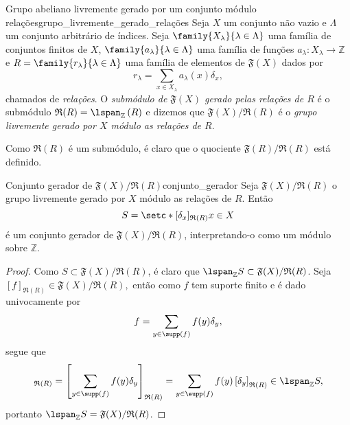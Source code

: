 \begin{definition}{Grupo abeliano livremente gerado por um conjunto módulo relações}{grupo_livremente_gerado_relações}
    Seja \(X\) um conjunto não vazio e \(\Lambda\) um conjunto arbitrário de índices. Seja \(\family{X_{\lambda}}{\lambda \in \Lambda}\) uma família de conjuntos finitos de \(X\), \(\family{a_{\lambda}}{\lambda \in \Lambda}\) uma família de funções \(a_{\lambda} : X_{\lambda} \to \mathbb{Z}\) e \(R = \family{r_{\lambda}}{\lambda \in \Lambda}\) uma família de elementos de \(\mathfrak{F}(X)\) dados por
    \begin{equation*}
        r_{\lambda} = \sum_{x \in X_{\lambda}} a_{\lambda}(x) \delta_{x},
    \end{equation*}
    chamados de \emph{relações}. O \emph{submódulo de \(\mathfrak{F}(X)\) gerado pelas relações de \(R\)} é o submódulo \(\mathfrak{R}(R) = \lspan_{\mathbb{Z}}\left(R\right)\) e dizemos que \(\mathfrak{F}(X)/\mathfrak{R}(R)\) é o \emph{grupo livremente gerado por \(X\) módulo as relações de \(R\)}.
\end{definition}
\begin{remark}
    Como \(\mathfrak{R}(R)\) é um submódulo, é claro que o quociente \(\mathfrak{F}(R)/\mathfrak{R}(R)\) está definido.
\end{remark}

\begin{lemma}{Conjunto gerador de \(\mathfrak{F}(X)/\mathfrak{R}(R)\)}{conjunto_gerador}
    Seja \(\mathfrak{F}(X)/\mathfrak{R}(R)\) o grupo livremente  gerado por \(X\) módulo as relações de \(R\). Então
    \begin{equation*}
        S = \setc*{[\delta_{x}]_{\mathfrak{R}(R)}}{x \in X}
    \end{equation*}
    é um conjunto gerador de \(\mathfrak{F}(X)/\mathfrak{R}(R)\), interpretando-o como um módulo sobre \(\mathbb{Z}\).
\end{lemma}
\begin{proof}
    Como \(S \subset \mathfrak{F}(X)/\mathfrak{R}(R)\), é claro que \(\lspan_{\mathbb{Z}}S \subset \mathfrak{F}(X)/\mathfrak{R}(R)\). Seja \([f]_{\mathfrak{R}(R)} \in \mathfrak{F}(X)/\mathfrak{R}(R),\) então como \(f\) tem suporte finito e é dado univocamente por
    \begin{equation*}
        f = \sum_{y \in \supp(f)}{f(y) \delta_y},
    \end{equation*}
    segue que
    \begin{equation*}
        [f]_{\mathfrak{R}(R)} = \left[\sum_{y \in \supp(f)}{f(y) \delta_y}\right]_{\mathfrak{R}(R)} = \sum_{y \in \supp(f)}{f(y)\left[\delta_{y}\right]_{\mathfrak{R}(R)}} \in \lspan_{\mathbb{Z}}S,
    \end{equation*}
    portanto \(\lspan_{\mathbb{Z}}S = \mathfrak{F}(X)/\mathfrak{R}(R)\).
\end{proof}


